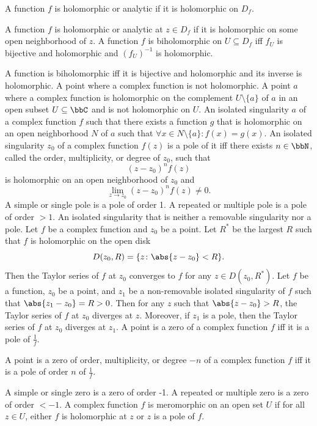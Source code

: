 \documentclass[a4paper,12pt]{article}
\begin{document}
A function $f$ is holomorphic or analytic if it is holomorphic on $D_f$.

A function $f$ is holomorphic or analytic at $z\in D_f$ if it is holomorphic on some open neighborhood of $z$.
A function $f$ is biholomorphic on $U\subseteq D_f$ iff $f_U$ is bijective and holomorphic and $(f_U)^{-1}$ is holomorphic.

A function is biholomorphic iff it is bijective and holomorphic and its inverse is holomorphic.
A point where a complex function is not holomorphic.
A point $a$ where a complex function is holomorphic on the complement $U\setminus\{a\}$ of $a$ in an open subset $U\subseteq\bbC$ and is not holomorphic on $U$.
An isolated singularity $a$ of a complex function $f$ such that there exists a function $g$ that is holomorphic on an open neighborhood $N$ of $a$ such that $\forall x\in N\setminus\{a\}\colon f(x)=g(x)$.
An isolated singularity $z_0$ of a complex function $f(z)$ is a pole of it iff there exists $n\in\bbN$, called the order, multiplicity, or degree of $z_0$, such that
\[(z-z_0)^nf(z)\]
is holomorphic on an open neighborhood of $z_0$ and
\[\lim_{z\to z_0}(z-z_0)^nf(z)\neq 0.\]
A simple or single pole is a pole of order 1. A repeated or multiple pole is a pole of order $>1$.
An isolated singularity that is neither a removable singularity nor a pole.
Let $f$ be a complex function and $z_0$ be a point. Let $R^*$ be the largest $R$ such that $f$ is holomorphic on the open disk
\[D(z_0,R)=\{z\colon\abs{z-z_0}<R\}.\]
Then the Taylor series of $f$ at $z_0$ converges to $f$ for any $z\in D(z_0,R^*)$.
Let $f$ be a function, $z_0$ be a point, and $z_1$ be a non-removable isolated singularity of $f$ such that $\abs{z_1-z_0}=R>0$. Then for any $z$ such that $\abs{z-z_0}>R$, the Taylor series of $f$ at $z_0$ diverges at $z$. Moreover, if $z_1$ is a pole, then the Taylor series of $f$ at $z_0$ diverges at $z_1$.
A point is a zero of a complex function $f$ iff it is a pole of $\frac{1}{f}$.

A point is a zero of order, multiplicity, or degree $-n$ of a complex function $f$ iff it is a pole of order $n$ of $\frac{1}{f}$.

A simple or single zero is a zero of order -1. A repeated or multiple zero is a zero of order $<-1$.
A complex function $f$ is meromorphic on an open set $U$ if for all $z\in U$, either $f$ is holomorphic at $z$ or $z$ is a pole of $f$.
\end{document}
